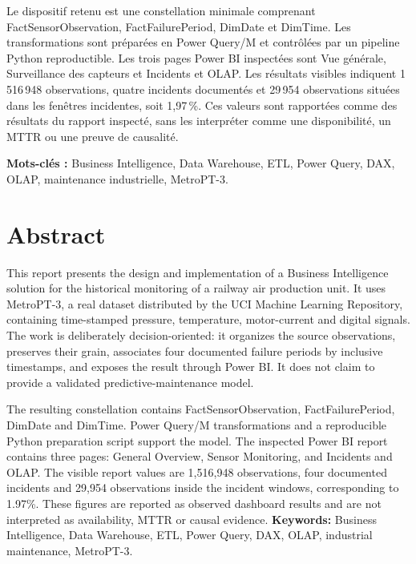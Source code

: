 \documentclass[12pt,oneside]{book}
\begin{document}
Le dispositif retenu est une constellation minimale comprenant FactSensorObservation, FactFailurePeriod, DimDate et DimTime. Les transformations sont préparées en Power Query/M et contrôlées par un pipeline Python reproductible. Les trois pages Power BI inspectées sont Vue générale, Surveillance des capteurs et Incidents et OLAP. Les résultats visibles indiquent 1\,516\,948 observations, quatre incidents documentés et 29\,954 observations situées dans les fenêtres incidentes, soit 1,97\,\%. Ces valeurs sont rapportées comme des résultats du rapport inspecté, sans les interpréter comme une disponibilité, un MTTR ou une preuve de causalité.

\textbf{Mots-clés :} Business Intelligence, Data Warehouse, ETL, Power Query, DAX, OLAP, maintenance industrielle, MetroPT-3.
\chapter*{Abstract}
This report presents the design and implementation of a Business Intelligence solution for the historical monitoring of a railway air production unit. It uses MetroPT-3, a real dataset distributed by the UCI Machine Learning Repository, containing time-stamped pressure, temperature, motor-current and digital signals. The work is deliberately decision-oriented: it organizes the source observations, preserves their grain, associates four documented failure periods by inclusive timestamps, and exposes the result through Power BI. It does not claim to provide a validated predictive-maintenance model.

The resulting constellation contains FactSensorObservation, FactFailurePeriod, DimDate and DimTime. Power Query/M transformations and a reproducible Python preparation script support the model. The inspected Power BI report contains three pages: General Overview, Sensor Monitoring, and Incidents and OLAP. The visible report values are 1,516,948 observations, four documented incidents and 29,954 observations inside the incident windows, corresponding to 1.97\%. These figures are reported as observed dashboard results and are not interpreted as availability, MTTR or causal evidence.
\textbf{Keywords:} Business Intelligence, Data Warehouse, ETL, Power Query, DAX, OLAP, industrial maintenance, MetroPT-3.
\end{document}
